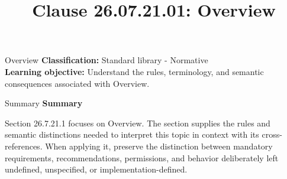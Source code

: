 \documentclass[10pt,letterpaper]{article}
\title{Clause 26.07.21.01: Overview}
\author{}
\date{}
\begin{document}
\maketitle
\begin{CornellOverviewBox}{Overview}
\textbf{Classification:} Standard library - Normative\\[2pt]
\textbf{Learning objective:} Understand the rules, terminology, and semantic consequences associated with Overview.
\end{CornellOverviewBox}\begin{CornellSummaryBox}{Summary}
{\sffamily\bfseries\color{Accent} Summary}\par\vspace{3pt}Section 26.7.21.1 focuses on Overview. The section supplies the rules and semantic distinctions needed to interpret this topic in context with its cross-references. When applying it, preserve the distinction between mandatory requirements, recommendations, permissions, and behavior deliberately left undefined, unspecified, or implementation-defined.
\end{CornellSummaryBox}
\end{document}
